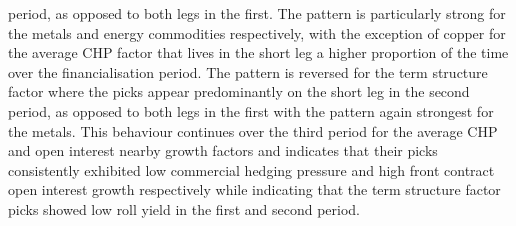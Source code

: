 \documentclass[
  authoryear,
  preprint,
  3p]{elsarticle}
\begin{document}
period, as opposed to both legs in the first. The pattern is
particularly strong for the metals and energy commodities respectively,
with the exception of copper for the average CHP factor that lives in
the short leg a higher proportion of the time over the financialisation
period. The pattern is reversed for the term structure factor where the
picks appear predominantly on the short leg in the second period, as
opposed to both legs in the first with the pattern again strongest for
the metals. This behaviour continues over the third period for the
average CHP and open interest nearby growth factors and indicates that
their picks consistently exhibited low commercial hedging pressure and
high front contract open interest growth respectively while indicating
that the term structure factor picks showed low roll yield in the first
and second period.

\medskip
\end{document}
